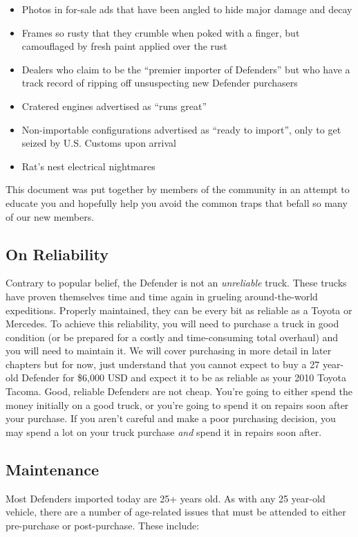 \documentclass{article}
\begin{document}
\begin{itemize}
 \item Photos in for-sale ads that have been angled to hide major damage and decay
 \item Frames so rusty that they crumble when poked with a finger, but camouflaged by fresh paint applied over the rust
 \item Dealers who claim to be the ``premier importer of Defenders'' but who have a track record of ripping off unsuspecting new Defender purchasers
 \item Cratered engines advertised as ``runs great''
 \item Non-importable configurations advertised as ``ready to import'', only to get seized by U.S. Customs upon arrival
 \item Rat's nest electrical nightmares
\end{itemize}

This document was put together by members of the community in an attempt to educate you and hopefully help you avoid the common traps that befall so many of our new members.

\subsection{On Reliability}
Contrary to popular belief, the Defender is not an \textit{unreliable} truck.  These trucks have proven themselves time and time again in grueling around-the-world expeditions.  Properly maintained, they can be every bit as reliable as a Toyota or Mercedes.  To achieve this reliability, you will need to purchase a truck in good condition (or be prepared for a costly and time-consuming total overhaul) and you will need to maintain it.  We will cover purchasing in more detail in later chapters but for now, just understand that you cannot expect to buy a 27 year-old Defender for \$6,000 USD and expect it to be as reliable as your 2010 Toyota Tacoma.  Good, reliable Defenders are not cheap.  You're going to either spend the money initially on a good truck, or you're going to spend it on repairs soon after your purchase.  If you aren't careful and make a poor purchasing decision, you may spend a lot on your truck purchase \textit{and} spend it in repairs soon after.

\subsection{Maintenance}
Most Defenders imported today are 25+ years old.  As with any 25 year-old vehicle, there are a number of age-related issues that must be attended to either pre-purchase or post-purchase.  These include:
\end{document}
